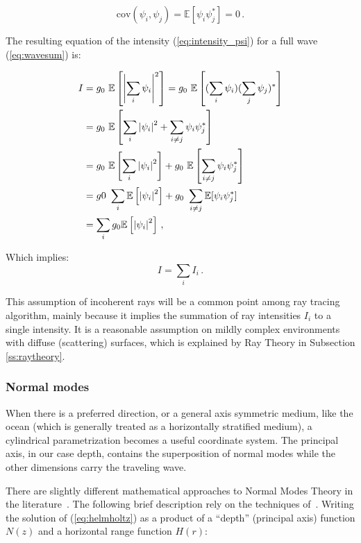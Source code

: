 \begin{equation}
\label{eq:wave_uncorr}
\text{cov}(\psi_i,\psi_j) = \mathbb{E}[\psi_i \psi_j^*] = 0\,.
\end{equation}

The resulting equation of the intensity (\ref{eq:intensity_psi}) for a
full wave (\ref{eq:wavesum}) is:

\begin{equation*}
\begin{split}
I &= g_0~\mathbb{E}\left[\left| \sum_i \psi_i \right| ^2\right] =
g_0~\mathbb{E}\left[ (\sum_i \psi_i)(\sum_j \psi_j)^*\right] \\
&= g_0~\mathbb{E}\left[\sum_i \left|\psi_i\right|^2 + \sum_{i \neq j} \psi_i
\psi_j^*\right] \\
&= g_0~\mathbb{E}\left[\sum_i \left|\psi_i\right|^2\right]  +
g_0~\mathbb{E}\left[\sum_{i \neq j} \psi_i \psi_j^*\right] \\
& = g0~\sum_i \mathbb{E}\left[\left|\psi_i\right|^2\right]  + g_0~\sum_{i \neq j}
\mathbb{E}[\psi_i \psi_j^*] \\
& = \sum_i g_0\mathbb{E}\left[\left|\psi_i\right|^2\right]\,,
\end{split}
\end{equation*}

Which implies:
\begin{equation}
\label{eq:intensity_sum}
I = \sum_i I_i\,.
\end{equation}

This assumption of incoherent rays will be a common point among ray tracing
algorithm, mainly because it implies the summation of ray intensities $I_i$ to a
single intensity. It is a reasonable assumption on mildly complex environments
with diffuse (scattering) surfaces, which is explained by Ray Theory
in Subsection \ref{ss:raytheory}.


\subsubsection{Normal modes}

When there is a preferred direction, or a general axis symmetric medium, like the
ocean (which is generally treated as a horizontally stratified medium), a
cylindrical parametrization becomes a useful coordinate system. The principal
axis, in our case depth, contains the superposition of normal modes while the
other dimensions carry the traveling wave.

There are slightly different mathematical approaches to Normal Modes Theory in
the literature~\cite{Etter2013,urick1979,buckingham1992ocean}. The following
brief description rely on the techniques of~\citet{Etter2013}. Writing the
solution of (\ref{eq:helmholtz}) as a product of a ``depth'' (principal
axis) function $N(z)$ and a horizontal range function $H(r)$:


